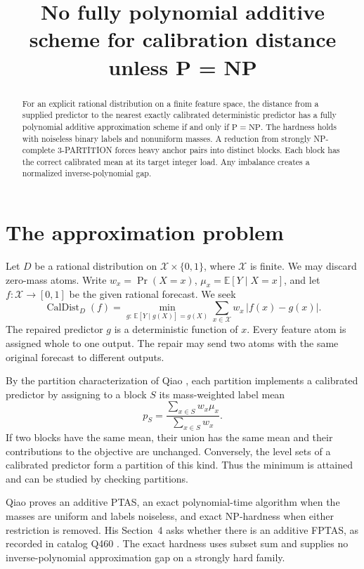 \documentclass[11pt,a4paper]{amsart}
\title{No fully polynomial additive scheme for calibration distance unless P = NP}
\date{}
\newcommand{\caldist}{\operatorname{CalDist}}
\begin{document}
\begin{abstract}
For an explicit rational distribution on a finite feature space, the
distance from a supplied predictor to the nearest exactly calibrated
deterministic predictor has a fully polynomial additive approximation
scheme if and only if \(\mathrm P=\mathrm{NP}\). The hardness holds
with noiseless binary labels and nonuniform masses. A reduction from
strongly NP-complete 3-PARTITION forces heavy anchor pairs into distinct
blocks. Each block has the correct calibrated mean at its target
integer load. Any imbalance creates a normalized inverse-polynomial gap.
\end{abstract}
\maketitle

\section{The approximation problem}

Let \(D\) be a rational distribution on \(\mathcal X\times\{0,1\}\),
where \(\mathcal X\) is finite. We may discard zero-mass atoms.
Write \(w_x=\Pr(X=x)\), \(\mu_x=\mathbb E[Y\mid X=x]\),
and let \(f:\mathcal X\to[0,1]\) be the given rational forecast.
We seek
\[
 \caldist_D(f)=
 \min_{g:\,\mathbb E[Y\mid g(X)]=g(X)}
       \sum_{x\in\mathcal X}w_x\,|f(x)-g(x)|.
\]
The repaired predictor \(g\) is a deterministic function of \(x\).
Every feature atom is assigned whole to one output. The repair may
send two atoms with the same original forecast to different outputs.

By the partition characterization of Qiao \cite[Fact~1]{qiao},
each partition implements a calibrated predictor by assigning to
a block \(S\) its mass-weighted label mean
\[
 p_S=\frac{\sum_{x\in S}w_x\mu_x}{\sum_{x\in S}w_x}.
\]
If two blocks have the same mean, their union has the same mean and
their contributions to the objective are unchanged. Conversely,
the level sets of a calibrated predictor form a partition of this
kind. Thus the minimum is attained and can be studied by checking
partitions.

Qiao \cite[Theorems~1--2]{qiao} proves an additive PTAS,
an exact polynomial-time algorithm when the masses are
uniform and labels noiseless, and exact NP-hardness when either
restriction is removed. His Section~4 asks whether there is an
additive FPTAS, as recorded in catalog Q460 \cite{catalog}.
The exact hardness uses subset sum and supplies no
inverse-polynomial approximation gap on a strongly hard family.
\end{document}
